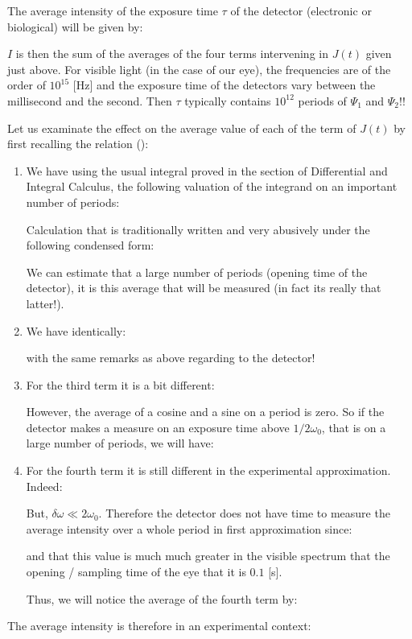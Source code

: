 	The average intensity of the exposure time $\tau$ of the detector (electronic or biological) will be given by:
	
	$I$ is then the sum of the averages of the four terms intervening in $J(t)$ given just above. For visible light (in the case of our eye), the frequencies are of the order of $10^{15}$ [Hz] and the exposure time of the detectors vary between the millisecond and the second. Then $\tau$ typically contains $10^{12}$ periods of $\Psi_1$ and $\Psi_2$!!

	Let us examinate the effect on the average value of each of the term of $J (t)$ by first recalling the relation ():
	
	\begin{enumerate}
		\item We have using the usual integral proved in the section of Differential and Integral Calculus, the following valuation of the integrand on an important number of periods:
		
		Calculation that is traditionally written and very abusively under the following condensed form:
		
		We can estimate that a large number of periods (opening time of the detector), it is this average that will be measured (in fact its really that latter!).
		
		\item  We have identically:
		
		with the same remarks as above regarding to the detector!
	
		\item For the third term it is a bit different:
		
		However, the average of a cosine and a sine on a period is zero. So if the detector makes a measure on an exposure time above $1/2\omega_0$, that is on a large number of periods, we will have:
		
		
		\item For the fourth term it is still different in the experimental approximation. Indeed:
		
		But, $\delta\omega \ll 2\omega_0$. Therefore the detector does not have time to measure the average intensity over a whole period in first approximation since:
		
		and that this value is much much greater in the visible spectrum that the opening / sampling time of the eye that it is $0.1$ [s].
	
		Thus, we will notice the average of the fourth term by:
		
	\end{enumerate}
	The average intensity is therefore in an experimental context:
	
